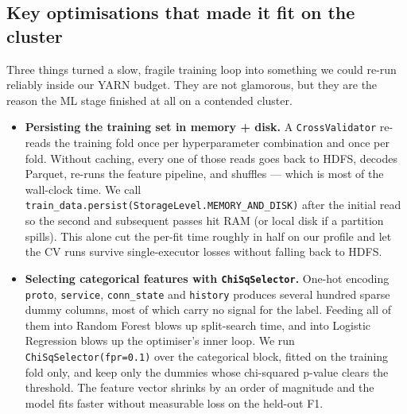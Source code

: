 \documentclass[11pt,a4paper]{article}
\begin{document}
\subsection{Key optimisations that made it fit on the cluster}

Three things turned a slow, fragile training loop into something we could
re-run reliably inside our YARN budget. They are not glamorous, but they
are the reason the ML stage finished at all on a contended cluster.

\begin{itemize}[leftmargin=2em]
    \item \textbf{Persisting the training set in memory + disk.} A
    \texttt{CrossValidator} re-reads the training fold once per
    hyperparameter combination and once per fold. Without caching, every
    one of those reads goes back to HDFS, decodes Parquet, re-runs the
    feature pipeline, and shuffles --- which is most of the wall-clock
    time. We call
    \texttt{train\_data.persist(StorageLevel.MEMORY\_AND\_DISK)} after the
    initial read so the second and subsequent passes hit RAM (or local
    disk if a partition spills). This alone cut the per-fit time roughly
    in half on our profile and let the CV runs survive single-executor
    losses without falling back to HDFS.

    \item \textbf{Selecting categorical features with \texttt{ChiSqSelector}.}
    One-hot encoding \texttt{proto}, \texttt{service}, \texttt{conn\_state}
    and \texttt{history} produces several hundred sparse dummy columns,
    most of which carry no signal for the label. Feeding all of them into
    Random Forest blows up split-search time, and into Logistic Regression
    blows up the optimiser's inner loop. We run \texttt{ChiSqSelector(fpr=0.1)}
    over the categorical block, fitted on the training fold only, and keep
    only the dummies whose chi-squared p-value clears the threshold. The
    feature vector shrinks by an order of magnitude and the model fits
    faster without measurable loss on the held-out F1.


\end{itemize}
\end{document}
